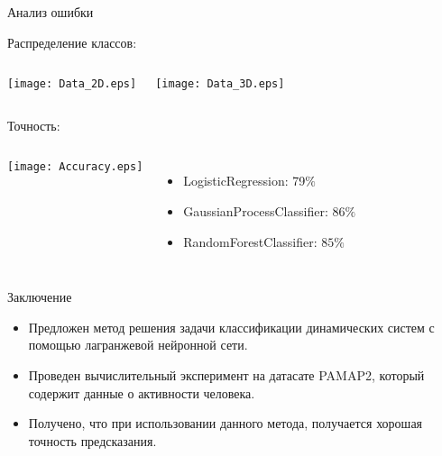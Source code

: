 \documentclass{beamer}
\begin{document}

\begin{frame}{Анализ ошибки}

    Распределение классов:

        \begin{columns}[c]
        
                \texttt{[image: Data\_2D.eps]}
                
                \texttt{[image: Data\_3D.eps]}
                
        \end{columns}

        Точность:

        \begin{columns}[c]
        
                \texttt{[image: Accuracy.eps]}
                
                    \begin{itemize}

                        \item LogisticRegression: 79$\%$

                        \item GaussianProcessClassifier: $86\%$

                        \item RandomForestClassifier: $85\%$

                    \end{itemize}
                
        \end{columns}


\end{frame}


\begin{frame}{Заключение}

    \begin{itemize}
    
        \item Предложен метод решения задачи классификации динамических систем с помощью лагранжевой нейронной сети.

        \item Проведен вычислительный эксперимент на датасате PAMAP2, который содержит данные о активности человека.
        
        \item Получено, что при использовании данного метода, получается хорошая точность предсказания.
        
    \end{itemize}
    
\end{frame}

\end{document}
